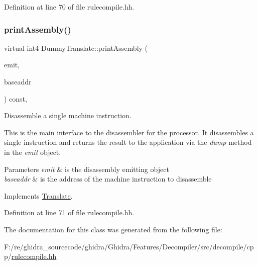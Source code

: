 Definition at line 70 of file rulecompile.\+hh.

\mbox{\label{class_dummy_translate_a7c3c565169bd97e37b568985c757ffdd}} 
\subsubsection{\texorpdfstring{printAssembly()}{printAssembly()}}
{\footnotesize\ttfamily virtual int4 Dummy\+Translate\+::print\+Assembly (\begin{DoxyParamCaption}\item[{\mbox{\hyperlink{class_assembly_emit}{Assembly\+Emit}} \&}]{emit,  }\item[{const \mbox{\hyperlink{class_address}{Address}} \&}]{baseaddr }\end{DoxyParamCaption}) const\hspace{0.3cm}{\ttfamily [inline]}, {\ttfamily [virtual]}}



Disassemble a single machine instruction. 

This is the main interface to the disassembler for the processor. It disassembles a single instruction and returns the result to the application via the {\itshape dump} method in the {\itshape emit} object. 
\begin{DoxyParams}{Parameters}
{\em emit} & is the disassembly emitting object \\
\hline
{\em baseaddr} & is the address of the machine instruction to disassemble \\
\hline
\end{DoxyParams}


Implements \mbox{\hyperlink{class_translate_ac97443bb89e0c6bfb68caf9f48a8c85d}{Translate}}.



Definition at line 71 of file rulecompile.\+hh.



The documentation for this class was generated from the following file\+:\begin{DoxyCompactItemize}
\item 
F\+:/re/ghidra\+\_\+sourcecode/ghidra/\+Ghidra/\+Features/\+Decompiler/src/decompile/cpp/\mbox{\hyperlink{rulecompile_8hh}{rulecompile.\+hh}}\end{DoxyCompactItemize}
